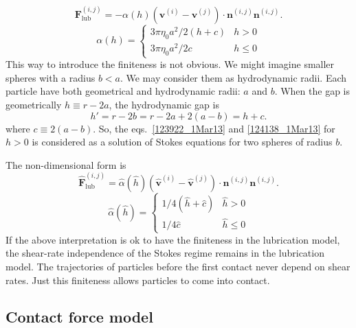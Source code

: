 \documentclass{article}
\begin{document}
%
\begin{equation}
  \bm{F}_{\mathrm{lub}}^{(i,j)}
  = -\alpha (h)
  (\bm{v}^{(i)} - \bm{v}^{(j)})\cdot
  \bm{n}^{(i,j)} \bm{n}^{(i,j)}.\label{123922_1Mar13}
\end{equation}
\begin{equation}
  \alpha(h)
  = 
  \begin{cases}
    3 \pi \eta_0 a^2 / 2(h+c) & h > 0 \\
    3 \pi \eta_0 a^2 / 2c & h\leq 0 
  \end{cases}\label{124138_1Mar13}
\end{equation}
%
This way to introduce the finiteness
is not obvious.
%
We might imagine smaller spheres
with a radius $b < a$.
%
We may consider them as hydrodynamic radii.
%
Each particle have 
both geometrical and hydrodynamic radii: $a$ and $b$.
%
When the gap is geometrically $h \equiv r - 2a$,
the hydrodynamic gap is
\begin{equation}
  h' = 
  r - 2b =
  r - 2a + 2(a-b) = h + c.
\end{equation}
where $c \equiv 2(a-b)$.
%
So, the eqs.~\eqref{123922_1Mar13} 
and \eqref{124138_1Mar13} for $h>0$
is considered as
a solution of Stokes equations
for two spheres of radius $b$.

The non-dimensional form
is 
\begin{equation}
  \hat{\bm{F}}_{\mathrm{lub}}^{(i,j)}
  = \hat{\alpha} (\hat{h})
  (\hat{\bm{v}}^{(i)} - \hat{\bm{v}}^{(j)})\cdot
  \bm{n}^{(i,j)} \bm{n}^{(i,j)}.
\end{equation}
\begin{equation}
  \hat{\alpha}(\hat{h})
  = 
  \begin{cases}
    1 / 4(\hat{h}+\hat{c}) & \hat{h} > 0 \\
    1 /4\hat{c} & \hat{h} \leq 0 
  \end{cases}
\end{equation}
%
If the above interpretation is ok 
to have the finiteness in 
the lubrication model,
the shear-rate independence
of the Stokes regime remains
in the lubrication model.
%
The trajectories of particles before the first contact
never depend on shear rates.
%
Just this finiteness
allows particles 
to come into contact.

\subsection*{Contact force model}
\end{document}
